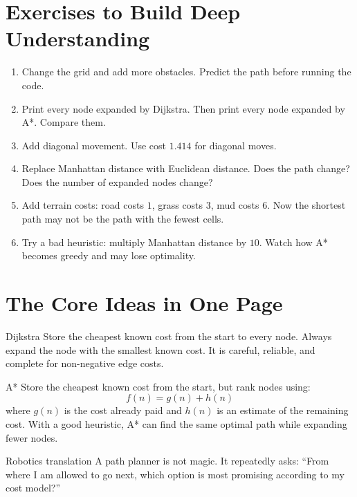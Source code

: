 \documentclass[11pt,a4paper]{article}
\begin{document}
\section{Exercises to Build Deep Understanding}

\begin{enumerate}[leftmargin=*]
  \item Change the grid and add more obstacles. Predict the path before running the code.
  \item Print every node expanded by Dijkstra. Then print every node expanded by A*. Compare them.
  \item Add diagonal movement. Use cost $1.414$ for diagonal moves.
  \item Replace Manhattan distance with Euclidean distance. Does the path change? Does the number of expanded nodes change?
  \item Add terrain costs: road costs $1$, grass costs $3$, mud costs $6$. Now the shortest path may not be the path with the fewest cells.
  \item Try a bad heuristic: multiply Manhattan distance by $10$. Watch how A* becomes greedy and may lose optimality.
\end{enumerate}

\section{The Core Ideas in One Page}

\begin{bigidea}{Dijkstra}
Store the cheapest known cost from the start to every node. Always expand the node with the smallest known cost. It is careful, reliable, and complete for non-negative edge costs.
\end{bigidea}

\begin{bigidea}{A*}
Store the cheapest known cost from the start, but rank nodes using:
\[
f(n)=g(n)+h(n)
\]
where $g(n)$ is the cost already paid and $h(n)$ is an estimate of the remaining cost. With a good heuristic, A* can find the same optimal path while expanding fewer nodes.
\end{bigidea}

\begin{gentle}{Robotics translation}
A path planner is not magic. It repeatedly asks: ``From where I am allowed to go next, which option is most promising according to my cost model?''
\end{gentle}
\end{document}
